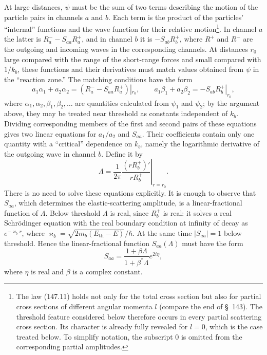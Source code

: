 At large distances, $\psi$ must be the sum of two terms describing the motion of the particle pairs in channels $a$ and $b$. Each term is the product of the particles' ``internal'' functions and the wave function for their relative motion\footnote{The law (147.11) holds not only for the total cross section but also for partial cross sections of different angular momenta $l$ (compare the end of \S~143). The threshold feature considered below therefore occurs in every partial scattering cross section. Its character is already fully revealed for $l=0$, which is the case treated below. To simplify notation, the subscript 0 is omitted from the corresponding partial amplitudes.}. In channel $a$ the latter is $R_a^- -S_{aa}R_a^+$, and in channel $b$ it is $-S_{ab}R_b^+$, where $R^+$ and $R^-$ are the outgoing and incoming waves in the corresponding channels. At distances $r_0$ large compared with the range of the short-range forces and small compared with $1/k_b$, these functions and their derivatives must match values obtained from $\psi$ in the ``reaction zone.'' The matching conditions have the form
\[
 a_1\alpha_1+a_2\alpha_2=(R_a^--S_{aa}R_a^+)|_{r_0},\qquad
 a_1\beta_1+a_2\beta_2=-S_{ab}R_b^+|_{r_0},
\]
where $\alpha_1,\alpha_2,\beta_1,\beta_2,\ldots$ are quantities calculated from $\psi_1$ and $\psi_2$; by the argument above, they may be treated near threshold as constants independent of $k_b$. Dividing corresponding members of the first and second pairs of these equations gives two linear equations for $a_1/a_2$ and $S_{aa}$. Their coefficients contain only one quantity with a ``critical'' dependence on $k_b$, namely the logarithmic derivative of the outgoing wave in channel $b$. Define it by
\[
 \Lambda=\left.\frac1{2\pi}\frac{(rR_b^+)'}{rR_b^+}\right|_{r=r_0}.
\]
There is no need to solve these equations explicitly. It is enough to observe that $S_{aa}$, which determines the elastic-scattering amplitude, is a linear-fractional function of $\Lambda$. Below threshold $\Lambda$ is real, since $R_b^+$ is real: it solves a real Schrödinger equation with the real boundary condition at infinity of decay as $e^{-\varkappa_b r}$, where $\varkappa_b=\sqrt{2m_b(E_{\mathrm{th}}-E)}/\hbar$. At the same time $|S_{aa}|=1$ below threshold. Hence the linear-fractional function $S_{aa}(\Lambda)$ must have the form
\begin{equation}
 S_{aa}=\frac{1+\beta\Lambda}{1+\beta^*\Lambda}e^{2i\eta},
 \tag{147.12}
\end{equation}
where $\eta$ is real and $\beta$ is a complex constant.

